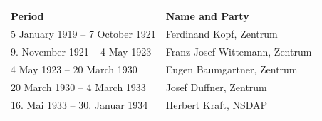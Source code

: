 \documentclass{article}
\begin{document}
\begin{tabular}{ll}
\toprule
Period & Name and Party \\
\midrule
5 January 1919 – 7 October 1921 & Ferdinand Kopf, Zentrum \\
9. November 1921 – 4 May 1923 & Franz Josef Wittemann, Zentrum \\
4 May 1923 – 20 March 1930 & Eugen Baumgartner, Zentrum \\
20 March 1930 – 4 March 1933 & Josef Duffner, Zentrum \\
16. Mai 1933 – 30. Januar 1934 & Herbert Kraft, NSDAP \\
\bottomrule
\end{tabular}
\end{document}
